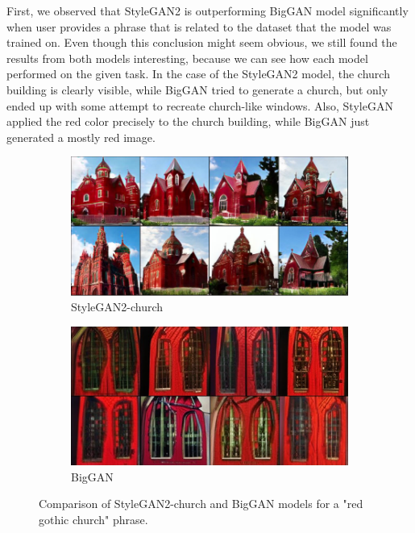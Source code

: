 \documentclass[11pt,a4paper,openany]{book}
\begin{document}
\noindent First, we observed that StyleGAN2 is outperforming BigGAN model significantly when user provides a phrase that is related to the dataset that the model was trained on. Even though this conclusion might seem obvious, we still found the results from both models interesting, because we can see how each model performed on the given task. In the case of the StyleGAN2 model, the church building is clearly visible, while BigGAN tried to generate a church, but only ended up with some attempt to recreate church-like windows. Also, StyleGAN applied the red color precisely to the church building, while BigGAN just generated a mostly red image.
\begin{figure}[H]
\centering
\begin{subfigure}[b]{0.8\textwidth}
   \includegraphics[width=1\linewidth, scale=0.2]{redgothic_stylegan.PNG}
   \caption{StyleGAN2-church}
   \label{fig:Ng1} 
\end{subfigure}

\begin{subfigure}[b]{0.8\textwidth}
   \includegraphics[width=1\linewidth, scale=0.2]{redgothic_biggan.PNG}
   \caption{BigGAN}
   \label{fig:Ng2}
\end{subfigure}
\caption[pics]{Comparison of StyleGAN2-church and BigGAN models for a "red gothic church" phrase.}
\end{figure}
\end{document}
